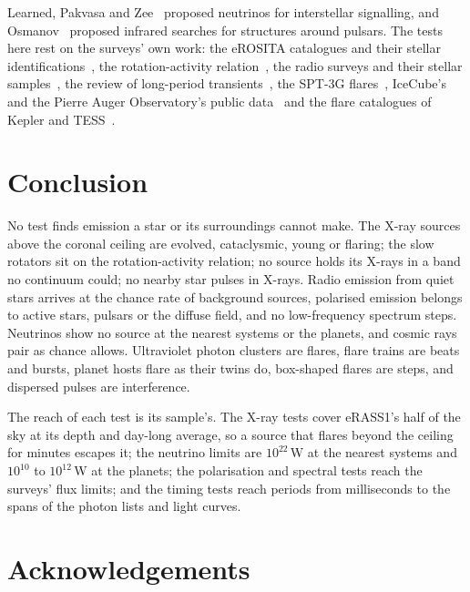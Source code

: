 \documentclass[3p,11pt]{elsarticle}
\begin{document}
Learned, Pakvasa and Zee~\cite{Learned2009} proposed neutrinos for interstellar
signalling, and Osmanov~\cite{Osmanov2016} proposed infrared searches for structures around
pulsars. The tests here rest on the surveys' own work: the eROSITA catalogues and their
stellar identifications~\cite{Merloni2024,Schneider2022,Freund2024}, the rotation-activity
relation~\cite{Pizzolato2003,Wright2011}, the radio surveys and their stellar
samples~\cite{Lacy2020,Shimwell2022,Hale2021,Callingham2023,Pritchard2021,Condon1998,HurleyWalker2022},
the review of long-period transients~\cite{Rea2026}, the SPT-3G
flares~\cite{Tandoi2024}, IceCube's and the Pierre Auger Observatory's public
data~\cite{IceCube2021,Auger2022} and the flare catalogues of Kepler and
TESS~\cite{YangLiu2019,Yang2023}.

\section{Conclusion}\label{sec:conclusion}

No test finds emission a star or its surroundings cannot make. The X-ray sources above the
coronal ceiling are evolved, cataclysmic, young or flaring; the slow rotators sit on the
rotation-activity relation; no source holds its X-rays in a band no continuum could; no
nearby star pulses in X-rays. Radio emission from quiet stars arrives at the chance rate of
background sources, polarised emission belongs to active stars, pulsars or the diffuse
field, and no low-frequency spectrum steps. Neutrinos show no source at the nearest systems
or the planets, and cosmic rays pair as chance allows. Ultraviolet photon clusters are
flares, flare trains are beats and bursts, planet hosts flare as their twins do, box-shaped
flares are steps, and dispersed pulses are interference.

The reach of each test is its sample's. The X-ray tests cover eRASS1's half of the sky
at its depth and day-long average, so a source that flares beyond the ceiling for minutes
escapes it; the neutrino limits are $10^{22}$\,W at the nearest systems and $10^{10}$ to
$10^{12}$\,W at the planets; the polarisation and spectral tests reach the surveys'
flux limits; and the timing tests reach periods from milliseconds to the spans of the
photon lists and light curves.

\section*{Acknowledgements}
\end{document}
